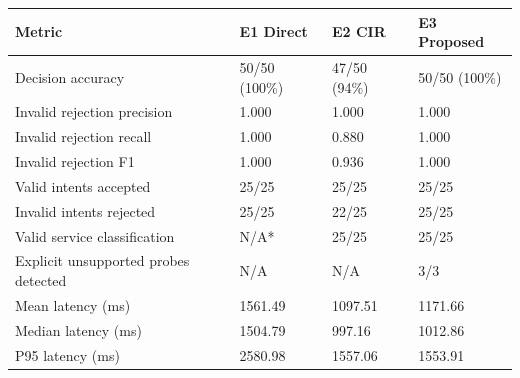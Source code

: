 \begin{tabular}{llll}
\toprule
Metric & E1 Direct & E2 CIR & E3 Proposed \\
\midrule
Decision accuracy & 50/50 (100\%) & 47/50 (94\%) & 50/50 (100\%) \\
Invalid rejection precision & 1.000 & 1.000 & 1.000 \\
Invalid rejection recall & 1.000 & 0.880 & 1.000 \\
Invalid rejection F1 & 1.000 & 0.936 & 1.000 \\
Valid intents accepted & 25/25 & 25/25 & 25/25 \\
Invalid intents rejected & 25/25 & 22/25 & 25/25 \\
Valid service classification & N/A* & 25/25 & 25/25 \\
Explicit unsupported probes detected & N/A & N/A & 3/3 \\
Mean latency (ms) & 1561.49 & 1097.51 & 1171.66 \\
Median latency (ms) & 1504.79 & 997.16 & 1012.86 \\
P95 latency (ms) & 2580.98 & 1557.06 & 1553.91 \\
\bottomrule
\end{tabular}
